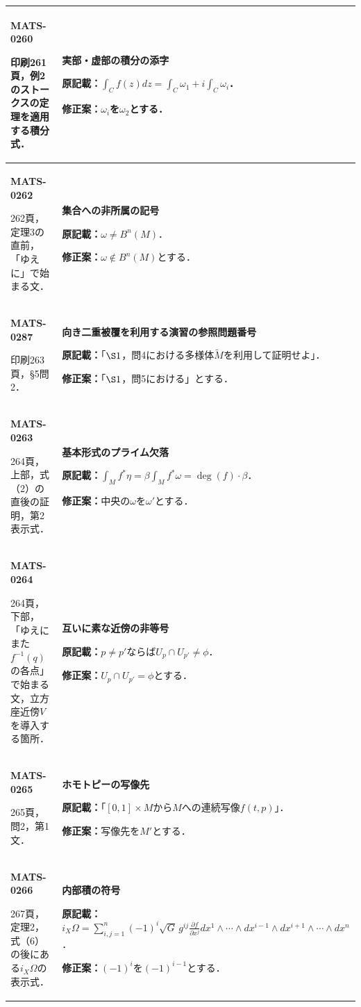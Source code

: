 \documentclass[a4paper,10pt]{ltjsarticle}
\begin{document}
\begin{longtable}{@{}>{\raggedright\arraybackslash}p{.19\linewidth}>{\raggedright\arraybackslash}p{.77\linewidth}@{}}
\hline
\hypertarget{MATS-0260}{}\textbf{MATS-0260}\par 印刷261頁，例2のストークスの定理を適用する積分式． & \textbf{実部・虚部の積分の添字}\par\textbf{原記載：}$\int_Cf(z)dz=\int_C\omega_1+i\int_C\omega_i$．\par\textbf{修正案：}$\omega_i$を$\omega_2$とする． \\[3pt]
\hline
\hypertarget{MATS-0262}{}\textbf{MATS-0262}\par 262頁，定理3の直前，「ゆえに」で始まる文． & \textbf{集合への非所属の記号}\par\textbf{原記載：}$\omega\ne B^n(M)$．\par\textbf{修正案：}$\omega\notin B^n(M)$とする． \\[3pt]
\hline
\hypertarget{MATS-0287}{}\textbf{MATS-0287}\par 印刷263頁，§5問2． & \textbf{向き二重被覆を利用する演習の参照問題番号}\par\textbf{原記載：}「$\S1$，問4における多様体$\widetilde M$を利用して証明せよ」．\par\textbf{修正案：}「$\S1$，問5における」とする． \\[3pt]
\hline
\hypertarget{MATS-0263}{}\textbf{MATS-0263}\par 264頁，上部，式（2）の直後の証明，第2表示式． & \textbf{基本形式のプライム欠落}\par\textbf{原記載：}$\displaystyle\int_M f^*\eta=\beta\int_M f^*\omega=\deg(f)\cdot\beta$．\par\textbf{修正案：}中央の$\omega$を$\omega'$とする． \\[3pt]
\hline
\hypertarget{MATS-0264}{}\textbf{MATS-0264}\par 264頁，下部，「ゆえにまた$f^{-1}(q)$の各点」で始まる文，立方座近傍$V$を導入する箇所． & \textbf{互いに素な近傍の非等号}\par\textbf{原記載：}$p\ne p'$ならば$U_p\cap U_{p'}\ne\phi$．\par\textbf{修正案：}$U_p\cap U_{p'}=\phi$とする． \\[3pt]
\hline
\hypertarget{MATS-0265}{}\textbf{MATS-0265}\par 265頁，問2，第1文． & \textbf{ホモトピーの写像先}\par\textbf{原記載：}「$[0,1]\times M$から$M$への連続写像$f(t,p)$」．\par\textbf{修正案：}写像先を$M'$とする． \\[3pt]
\hline
\hypertarget{MATS-0266}{}\textbf{MATS-0266}\par 267頁，定理2，式（6）の後にある$i_X\Omega$の表示式． & \textbf{内部積の符号}\par\textbf{原記載：}$\displaystyle i_X\Omega=\sum_{i,j=1}^n(-1)^i\sqrt G\,g^{ij}\frac{\partial f}{\partial x^j}dx^1\wedge\cdots\wedge dx^{i-1}\wedge dx^{i+1}\wedge\cdots\wedge dx^n$．\par\textbf{修正案：}$(-1)^i$を$(-1)^{i-1}$とする． \\[3pt]

\end{longtable}
\end{document}
